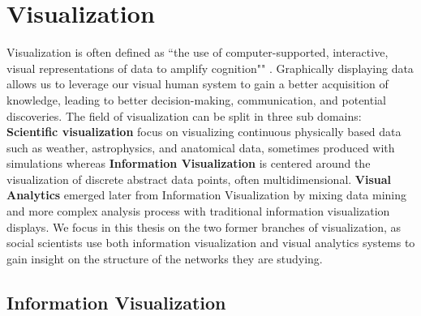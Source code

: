 \section{Visualization}

Visualization is often defined as ``the use of computer-supported, interactive, visual representations of data to amplify cognition"" \cite{cardReadingsInformationVisualization1999}.
Graphically displaying data allows us to leverage our visual human system to gain a better acquisition of knowledge, leading to better decision-making, communication, and potential discoveries.
The field of visualization can be split in three sub domains: \textbf{Scientific visualization} focus on visualizing continuous physically based data such as weather, astrophysics, and anatomical data, sometimes produced with simulations whereas \textbf{Information Visualization} is centered around the visualization of discrete abstract data points, often multidimensional. \textbf{Visual Analytics} emerged later from Information Visualization by mixing data mining and more complex analysis process with traditional information visualization displays.
We focus in this thesis on the two former branches of visualization, as social scientists use both information visualization and visual analytics systems to gain insight on the structure of the networks they are studying.


\subsection{Information Visualization}

